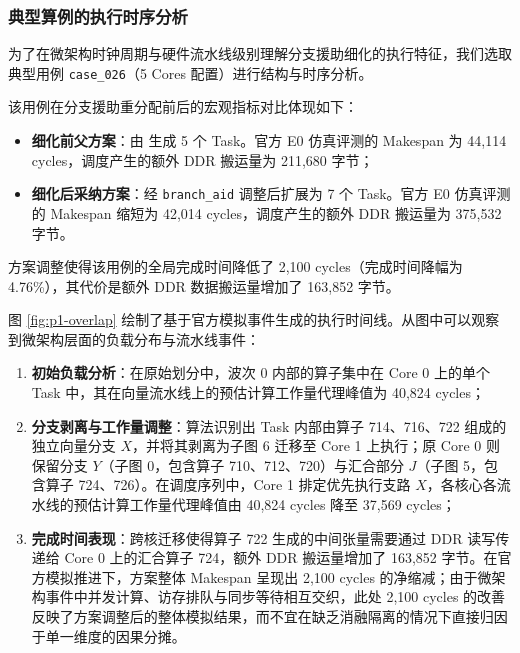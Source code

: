 \documentclass[anonymous,withtoc]{gmcm2026}
\providecommand{\tightlist}{\setlength{\itemsep}{0pt}\setlength{\parskip}{0pt}}
\begin{document}
\subsubsection{典型算例的执行时序分析}

为了在微架构时钟周期与硬件流水线级别理解分支援助细化的执行特征，我们选取典型用例 \texttt{case\_026}（5 Cores 配置）进行结构与时序分析。

该用例在分支援助重分配前后的宏观指标对比体现如下：

\begin{itemize}
\tightlist
\item
  \textbf{细化前父方案}：由 \texttt{} 生成 5 个 Task。官方 E0 仿真评测的 Makespan 为 44,114 cycles，调度产生的额外 DDR 搬运量为 211,680 字节；
\item
  \textbf{细化后采纳方案}：经 \texttt{branch\_aid} 调整后扩展为 7 个 Task。官方 E0 仿真评测的 Makespan 缩短为 42,014 cycles，调度产生的额外 DDR 搬运量为 375,532 字节。
\end{itemize}

方案调整使得该用例的全局完成时间降低了 2,100 cycles（完成时间降幅为 4.76\%），其代价是额外 DDR 数据搬运量增加了 163,852 字节。

图 \ref{fig:p1-overlap} 绘制了基于官方模拟事件生成的执行时间线。从图中可以观察到微架构层面的负载分布与流水线事件：

\begin{enumerate}
\def\labelenumi{\arabic{enumi}.}
\tightlist
\item
  \textbf{初始负载分析}：在原始划分中，波次 0 内部的算子集中在 Core 0 上的单个 Task 中，其在向量流水线上的预估计算工作量代理峰值为 40,824 cycles；
\item
  \textbf{分支剥离与工作量调整}：算法识别出 Task 内部由算子 714、716、722 组成的独立向量分支 \(X\)，并将其剥离为子图 6 迁移至 Core 1 上执行；原 Core 0 则保留分支 \(Y\)（子图 0，包含算子 710、712、720）与汇合部分 \(J\)（子图 5，包含算子 724、726）。在调度序列中，Core 1 排定优先执行支路 \(X\)，各核心各流水线的预估计算工作量代理峰值由 40,824 cycles 降至 37,569 cycles；
\item
  \textbf{完成时间表现}：跨核迁移使得算子 722 生成的中间张量需要通过 DDR 读写传递给 Core 0 上的汇合算子 724，额外 DDR 搬运量增加了 163,852 字节。在官方模拟推进下，方案整体 Makespan 呈现出 2,100 cycles 的净缩减；由于微架构事件中并发计算、访存排队与同步等待相互交织，此处 2,100 cycles 的改善反映了方案调整后的整体模拟结果，而不宜在缺乏消融隔离的情况下直接归因于单一维度的因果分摊。
\end{enumerate}
\end{document}
